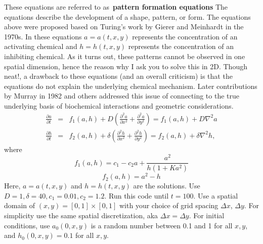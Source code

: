 \documentclass[12pt,pdftex]{report}
\theoremstyle{definition}
\begin{document}
\noindent These equations are referred to as~\textbf{pattern formation equations} The equations describe the development of a shape, pattern, or form.  The equations above were proposed based on Turing's work by Gierer and Meinhardt in the 1970s. In these equations $a = a(t,x,y)$ represents the concentration of an activating chemical and $h = h(t,x,y)$ represents the concentration of an inhibiting chemical. As it turns out, these patterns cannot be observed in one spatial dimension, hence the reason why I ask you to solve this in 2D. Though neat!, a drawback to these equations (and an overall criticism) is that the equations do not explain the underlying chemical mechanism.  Later contributions by Murray in 1982 and others addressed this issue of connecting to the true underlying basis of biochemical interactions and geometric considerations. 
\begin{eqnarray}
\frac{\partial a}{\partial t} &=& f_1(a,h) + D \left( \frac{\partial^2 a}{\partial x^2} + \frac{\partial^2 a}{\partial y^2} \right) =  f_1(a,h) + D \nabla^2 a \\
\frac{\partial h}{\partial t} &=& f_2(a,h) + \delta \left( \frac{\partial^2 h}{\partial x^2} + \frac{\partial^2 h}{\partial y^2} \right) =  f_2(a,h) + \delta \nabla^2 h,
\end{eqnarray}
where
$$f_1(a,h) = c_1 - c_2 a + \frac{a^2}{h(1+Ka^2)}$$
$$f_2(a,h) = a^2 - h$$
Here, $a = a(t,x,y)$ and $h = h(t,x,y)$ are the solutions.  Use $D=1,\delta=40,c_1=0.01, c_2 = 1.2$. Run this code until $t=100$.  Use a spatial domain of $(x,y) = [0,1]\times[0,1]$ with your choice of grid spacing $\Delta x$, $\Delta y$. For simplicity use the same spatial discretization, aka $\Delta x = \Delta y$. For initial conditions, use $a_0(0,x,y)$ is a random number between 0.1 and 1 for all $x,y$, and $h_0(0,x,y) = 0.1$ for all $x,y$. 
\end{document}
